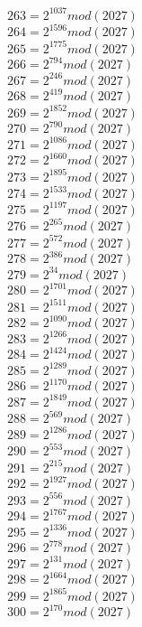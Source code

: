 \documentclass[12pt, letterpaper]{article}
\begin{document}
\begin{itemize}
\begin{multicols}{3}
$263= 2^{1037} mod (2027)$\\
$264= 2^{1596} mod (2027)$\\
$265= 2^{1775} mod (2027)$\\
$266= 2^{794} mod (2027)$\\
$267= 2^{246} mod (2027)$\\
$268= 2^{419} mod (2027)$\\
$269= 2^{1852} mod (2027)$\\
$270= 2^{790} mod (2027)$\\
$271= 2^{1086} mod (2027)$\\
$272= 2^{1660} mod (2027)$\\
$273= 2^{1895} mod (2027)$\\
$274= 2^{1533} mod (2027)$\\
$275= 2^{1197} mod (2027)$\\
$276= 2^{265} mod (2027)$\\
$277= 2^{572} mod (2027)$\\
$278= 2^{386} mod (2027)$\\
$279= 2^{34} mod (2027)$\\
$280= 2^{1701} mod (2027)$\\
$281= 2^{1511} mod (2027)$\\
$282= 2^{1090} mod (2027)$\\
$283= 2^{1266} mod (2027)$\\
$284= 2^{1424} mod (2027)$\\
$285= 2^{1289} mod (2027)$\\
$286= 2^{1170} mod (2027)$\\
$287= 2^{1849} mod (2027)$\\
$288= 2^{569} mod (2027)$\\
$289= 2^{1286} mod (2027)$\\
$290= 2^{553} mod (2027)$\\
$291= 2^{215} mod (2027)$\\
$292= 2^{1927} mod (2027)$\\
$293= 2^{556} mod (2027)$\\
$294= 2^{1767} mod (2027)$\\
$295= 2^{1336} mod (2027)$\\
$296= 2^{778} mod (2027)$\\
$297= 2^{131} mod (2027)$\\
$298= 2^{1664} mod (2027)$\\
$299= 2^{1865} mod (2027)$\\
$300= 2^{170} mod (2027)$\\

\end{multicols}
\end{itemize}
\end{document}
